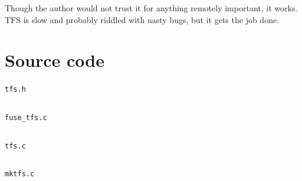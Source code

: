 \documentclass{report}
\newenvironment{longlisting}{\captionsetup{type=listing}}{}
\begin{document}
Though the author would not trust it for anything remotely important, it works.
TFS is slow and probably riddled with nasty bugs,
but it gets the job done.

\appendix

\chapter{Source code}


\begin{longlisting}
	\caption{\texttt{tfs.h}}
	\label{lst:tfsh}
	\inputminted{c}{../tfs.h}
\end{longlisting}

\begin{longlisting}
	\caption{\texttt{fuse\_tfs.c}}
	\label{lst:fuse}
	\inputminted{c}{../fuse_tfs.c}
\end{longlisting}

\begin{longlisting}
	\caption{\texttt{tfs.c}}
	\label{lst:tfs}
	\inputminted{c}{../tfs.c}
\end{longlisting}

\begin{longlisting}
	\caption{\texttt{mktfs.c}}
	\label{lst:mktfs}
	\inputminted{c}{../mktfs.c}
\end{longlisting}
\end{document}
